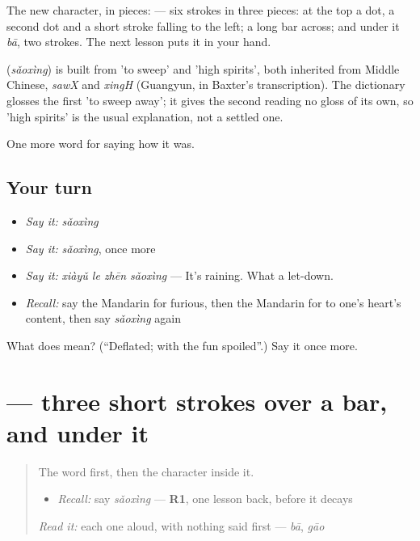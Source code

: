 The new character, in pieces:  — six strokes in three pieces: at the top a dot, a second dot and a short stroke falling to the left; a long bar across; and under it  \emph{bā}, two strokes. The next lesson puts it in your hand.

\begin{cousinweb}
\textbf{} (\emph{sǎoxìng}) is built from  'to sweep' and  'high spirits', both inherited from Middle Chinese, \emph{sawX} and \emph{xingH} (Guangyun, in Baxter's transcription). The dictionary glosses the first 'to sweep away'; it gives the second reading no gloss of its own, so 'high spirits' is the usual explanation, not a settled one.
\end{cousinweb}

\begin{grammarlens}[title={What you've built}]
One more word for saying how it was.
\end{grammarlens}

\subsection*{Your turn}
\begin{itemize}
\raggedright
  \item \emph{Say it:} \emph{sǎoxìng}
  \item \emph{Say it:} \emph{sǎoxìng}, once more
  \item \emph{Say it:} \emph{xiàyǔ le zhēn sǎoxìng} — It's raining. What a let-down.
  \item \emph{Recall:} say the Mandarin for furious, then the Mandarin for to one's heart's content, then say \emph{sǎoxìng} again
\end{itemize}

\begin{tcolorbox}[breakable,colback=teal!4,colframe=teal!35!black,title={Before you move on}]
What does  mean? (\textquotedblleft{}Deflated; with the fun spoiled\textquotedblright{}.) Say it once more.
\end{tcolorbox}
\section[\texorpdfstring{\zh{兴} (xìng)}{兴 (xìng)}]{ — three short strokes over a bar, and  under it}

\label{lesson:ZH-W465-xing-mood}



\begin{quote}
The word first, then the character inside it.

\begin{itemize}
\raggedright
  \item \emph{Recall:} say \emph{sǎoxìng} — \textbf{R1}, one lesson back, before it decays
\end{itemize}

\begin{quote}
 
\end{quote}

\emph{Read it:} each one aloud, with nothing said first — \emph{bā}, \emph{gāo}
\end{quote}

